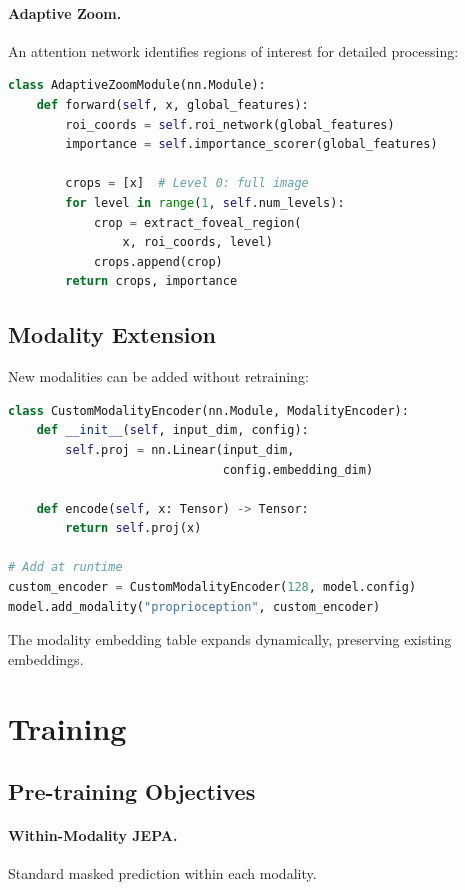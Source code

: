 \documentclass[11pt,twocolumn]{article}
\begin{document}
\paragraph{Adaptive Zoom.} An attention network identifies regions of interest for detailed processing:

\begin{lstlisting}[language=Python]
class AdaptiveZoomModule(nn.Module):
    def forward(self, x, global_features):
        roi_coords = self.roi_network(global_features)
        importance = self.importance_scorer(global_features)

        crops = [x]  # Level 0: full image
        for level in range(1, self.num_levels):
            crop = extract_foveal_region(
                x, roi_coords, level)
            crops.append(crop)
        return crops, importance
\end{lstlisting}

\subsection{Modality Extension}

New modalities can be added without retraining:

\begin{lstlisting}[language=Python]
class CustomModalityEncoder(nn.Module, ModalityEncoder):
    def __init__(self, input_dim, config):
        self.proj = nn.Linear(input_dim,
                              config.embedding_dim)

    def encode(self, x: Tensor) -> Tensor:
        return self.proj(x)

# Add at runtime
custom_encoder = CustomModalityEncoder(128, model.config)
model.add_modality("proprioception", custom_encoder)
\end{lstlisting}

The modality embedding table expands dynamically, preserving existing embeddings.

\section{Training}

\subsection{Pre-training Objectives}

\paragraph{Within-Modality JEPA.} Standard masked prediction within each modality.
\end{document}
